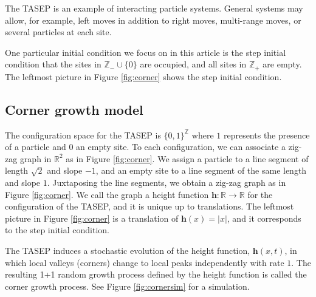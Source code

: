 \documentclass[10pt]{article}
\theoremstyle{plain}
\theoremstyle{definition}
\newcommand{\R}{\mathbb{R}}
\newcommand{\Z}{\mathbb{Z}}
\newcommand{\kheight}{\mathbf{h}} %
\numberwithin{equation}{section}
\begin{document}
The TASEP is an example of interacting particle systems. General systems may allow, for example, left moves in addition to right moves, multi-range moves, or several particles at each site. 

One particular initial condition we focus on in this article is the step initial condition that the sites in $\Z_-\cup\{0\}$ are occupied, and all sites in $\Z_+$ are empty. 
The leftmost picture in Figure \ref{fig:corner} shows the step initial condition. 

\subsection{Corner growth model}

The configuration space for the TASEP is $\{0,1\}^{\Z}$ where $1$ represents the presence of a particle and $0$ an empty site. 
To each configuration, we can associate a zig-zag graph in $\R^2$ as in Figure \ref{fig:corner}. 
We assign a particle to a line segment of length $\sqrt{2}$ and slope $-1$, and an empty site to a line segment of the same length and slope $1$. 
Juxtaposing the line segments, we obtain a zig-zag graph as in Figure \ref{fig:corner}.
We call the graph a height function $\kheight:\R\to \R$ for the configuration of the TASEP, and it is unique up to translations. 
The leftmost picture in Figure \ref{fig:corner} is a translation of $\kheight(x)=|x|$, and it corresponds to the step initial condition. 

The TASEP induces a stochastic evolution of the height function, $\kheight(x,t)$, in which  
local valleys (corners) change to local peaks independently with rate $1$. 
The resulting 1+1 random growth process defined by the height function is called the corner growth process. 
See Figure \ref{fig:cornersim} for a simulation. 

\end{document}
